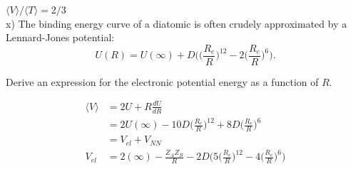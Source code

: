 \documentclass{article}
\begin{document}
{\color{blue} $\langle V\rangle/\langle T \rangle = 2/3$}
\\

\noindent x) The binding energy curve of a diatomic is often crudely approximated by a
Lennard-Jones potential:
\begin{equation*}
  U(R) = U(\infty) +D\Bigg(\Bigg(\frac{R_e}{R}\Bigg)^{12} - 2\Bigg(\frac{R_e}{R}\Bigg)^6\Bigg).
\end{equation*}

Derive an expression for the electronic potential energy as a function of $R$.

{\color{blue}
  \begin{align*}
    \langle V \rangle & = 2U + R\frac{dU}{dR} \\
    & = 2U(\infty) - 10D\Bigg(\frac{R_e}{R}\Bigg)^{12} + 8D\Bigg(\frac{R_e}{R}\Bigg)^6 \\
    & = V_{el} + V_{NN} \\
    V_{el} & = 2(\infty) -\frac{Z_AZ_B}{R} -2D\Bigg(5\Bigg(\frac{R_e}{R}\Bigg)^{12}-4\Bigg(\frac{R_e}{R}\Bigg)^6\Bigg)
  \end{align*}
}
\end{document}
